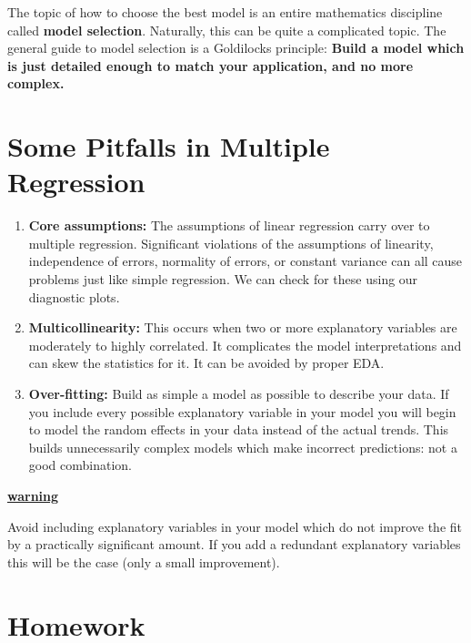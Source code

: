 \documentclass[
]{book}
\newenvironment{rmdblock}[1]
  {\begin{shaded*}
  \centerline{\underline{\textbf{#1}}}

  }
  {
  \end{shaded*}
  }
\newenvironment{warning}
  {\begin{rmdblock}{warning}}
  {\end{rmdblock}}
\theoremstyle{definition}
\theoremstyle{definition}
\theoremstyle{definition}
\theoremstyle{definition}
\theoremstyle{remark}
\begin{document}
The topic of how to choose the best model is an entire mathematics discipline called \textbf{model selection}. Naturally, this can be quite a complicated topic. The general guide to model selection is a Goldilocks principle: \textbf{Build a model which is just detailed enough to match your application, and no more complex.}

\hypertarget{some-pitfalls-in-multiple-regression}{%
\section{Some Pitfalls in Multiple Regression}\label{some-pitfalls-in-multiple-regression}}

\begin{enumerate}
\def\labelenumi{\arabic{enumi}.}
\item
  \textbf{Core assumptions:} The assumptions of linear regression carry over to multiple regression. Significant violations of the assumptions of linearity, independence of errors, normality of errors, or constant variance can all cause problems just like simple regression. We can check for these using our diagnostic plots.
\item
  \textbf{Multicollinearity:} This occurs when two or more explanatory variables are moderately to highly correlated. It complicates the model interpretations and can skew the statistics for it. It can be avoided by proper EDA.
\item
  \textbf{Over-fitting:} Build as simple a model as possible to describe your data. If you include every possible explanatory variable in your model you will begin to model the random effects in your data instead of the actual trends. This builds unnecessarily complex models which make incorrect predictions: not a good combination.
\end{enumerate}

\begin{warning}
Avoid including explanatory variables in your model which do not improve the fit by a practically significant amount. If you add a redundant explanatory variables this will be the case (only a small improvement).\\
\end{warning}

\hypertarget{homework-11}{%
\section{Homework}\label{homework-11}}
\end{document}
